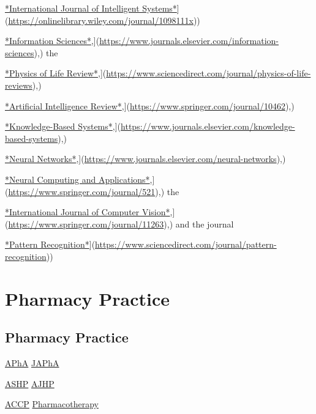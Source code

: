 \documentclass[
]{book}
\begin{document}
\href{\%5Bhttps://onlinelibrary.wiley.com/journal/1098111x}{*International Journal of Intelligent Systems*}{]}(\url{https://onlinelibrary.wiley.com/journal/1098111x}))

\href{\%5Bhttps://www.journals.elsevier.com/information-sciences}{*Information Sciences*},{]}(\url{https://www.journals.elsevier.com/information-sciences}),) the

\href{\%5Bhttps://www.sciencedirect.com/journal/physics-of-life-reviews}{*Physics of Life Review*},{]}(\url{https://www.sciencedirect.com/journal/physics-of-life-reviews}),)

\href{\%5Bhttps://www.springer.com/journal/10462}{*Artificial Intelligence Review*},{]}(\url{https://www.springer.com/journal/10462}),)

\href{\%5Bhttps://www.journals.elsevier.com/knowledge-based-systems}{*Knowledge-Based Systems*},{]}(\url{https://www.journals.elsevier.com/knowledge-based-systems}),)

\href{\%5Bhttps://www.journals.elsevier.com/neural-networks}{*Neural Networks*},{]}(\url{https://www.journals.elsevier.com/neural-networks}),)

\href{\%5Bhttps://www.springer.com/journal/521}{*Neural Computing and Applications*},{]}(\url{https://www.springer.com/journal/521}),) the

\href{\%5Bhttps://www.springer.com/journal/11263}{*International Journal of Computer Vision*},{]}(\url{https://www.springer.com/journal/11263}),) and the journal

\href{\%5Bhttps://www.sciencedirect.com/journal/pattern-recognition}{*Pattern Recognition*}{]}(\url{https://www.sciencedirect.com/journal/pattern-recognition}))

\chapter{Pharmacy Practice}\label{pharmacy-practice}

\section{Pharmacy Practice}\label{pharmacy-practice-1}

\href{https://www.pharmacist.com/}{APhA} \href{https://www.japha.org/}{JAPhA}

\href{https://www.ashp.org/}{ASHP} \href{https://academic.oup.com/ajhp}{AJHP}

\href{https://www.accp.com/}{ACCP} \href{https://accpjournals.onlinelibrary.wiley.com/journal/18759114}{Pharmacotherapy}
\end{document}
